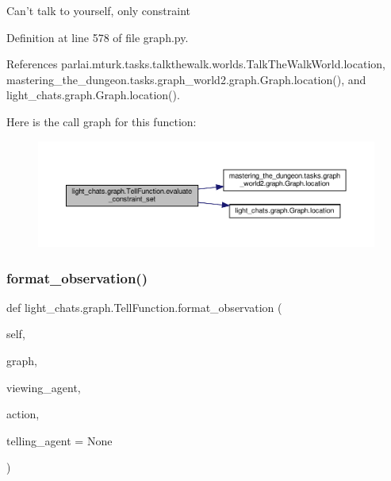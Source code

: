 \begin{DoxyVerb}Can't talk to yourself, only constraint\end{DoxyVerb}
 

Definition at line 578 of file graph.\+py.



References parlai.\+mturk.\+tasks.\+talkthewalk.\+worlds.\+Talk\+The\+Walk\+World.\+location, mastering\+\_\+the\+\_\+dungeon.\+tasks.\+graph\+\_\+world2.\+graph.\+Graph.\+location(), and light\+\_\+chats.\+graph.\+Graph.\+location().

Here is the call graph for this function\+:
\nopagebreak
\begin{figure}[H]
\begin{center}
\leavevmode
\includegraphics[width=350pt]{classlight__chats_1_1graph_1_1TellFunction_ad70758fa554b68e7b2517704a7ab5e76_cgraph}
\end{center}
\end{figure}
\mbox{\label{classlight__chats_1_1graph_1_1TellFunction_ab4c8496d4fa9e03040b6090eaa65528a}} 
\subsubsection{\texorpdfstring{format\+\_\+observation()}{format\_observation()}}
{\footnotesize\ttfamily def light\+\_\+chats.\+graph.\+Tell\+Function.\+format\+\_\+observation (\begin{DoxyParamCaption}\item[{}]{self,  }\item[{}]{graph,  }\item[{}]{viewing\+\_\+agent,  }\item[{}]{action,  }\item[{}]{telling\+\_\+agent = {\ttfamily None} }\end{DoxyParamCaption})}


